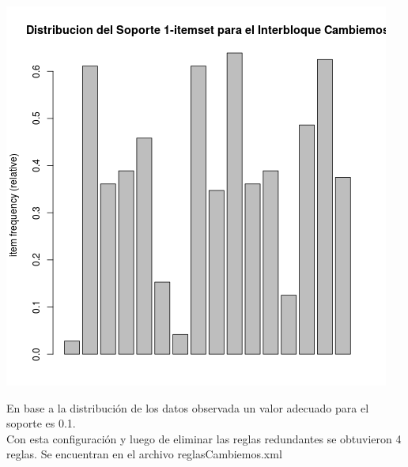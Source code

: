 \documentclass{endm}
\begin{document}
\begin{center}
\includegraphics[scale=0.4]{graficos/soportesCambiemos.png}
\end{center}

En base a la distribución de los datos observada un valor adecuado para el soporte es 0.1. \\

Con esta configuración y luego de eliminar las reglas redundantes se obtuvieron 4 reglas. Se encuentran en el archivo reglasCambiemos.xml  \\
\end{document}
